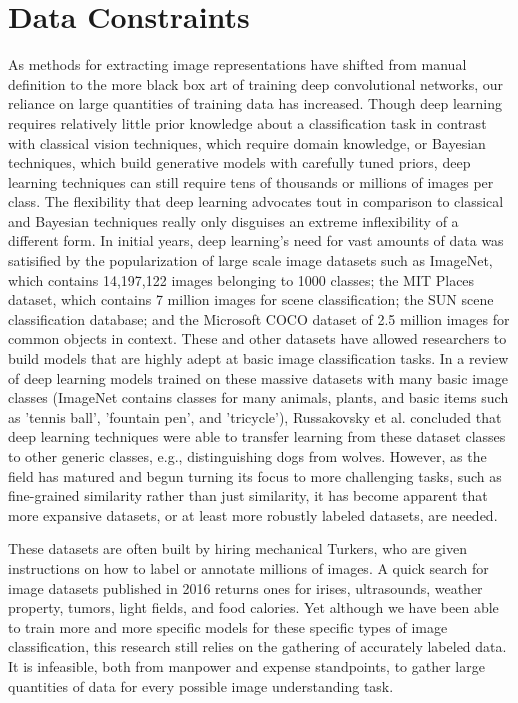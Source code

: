 \section{Data Constraints}
As methods for extracting image representations have shifted from manual definition to the more black box art of training deep convolutional networks, our reliance on large quantities of training data has increased. Though deep learning requires relatively little prior knowledge about a classification task in contrast with classical vision techniques, which require domain knowledge, or Bayesian techniques, which build generative models with carefully tuned priors, deep learning techniques can still require tens of thousands or millions of images per class. The flexibility that deep learning advocates tout in comparison to classical and Bayesian techniques really only disguises an extreme inflexibility of a different form. In initial years, deep learning's need for vast amounts of data was satisified by the popularization of large scale image datasets such as ImageNet, which contains 14,197,122 images belonging to 1000 classes\cite{deng2009imagenet}; the MIT Places dataset, which contains 7 million images for scene classification\cite{zhou2014learning}; the SUN scene classification database\cite{xiao2010sun}; and the Microsoft COCO dataset of 2.5 million images for common objects in context\cite{lin2014microsoft}. These and other datasets have allowed researchers to build models that are highly adept at basic image classification tasks\cite{russakovsky2013detecting}. In a review of deep learning models trained on these massive datasets with many basic image classes (ImageNet contains classes for many animals, plants, and basic items such as 'tennis ball', 'fountain pen', and 'tricycle'),  Russakovsky et al. concluded that deep learning techniques were able to transfer learning from these dataset classes to other generic classes, e.g., distinguishing dogs from wolves.\cite{russakovsky2013detecting} However, as the field has matured and begun turning its focus to more challenging tasks, such as fine-grained similarity rather than just similarity, it has become apparent that more expansive datasets, or at least more robustly labeled datasets, are needed.

These datasets are often built by hiring mechanical Turkers, who are given instructions on how to label or annotate millions of images. A quick search for image datasets published in 2016 returns ones for irises, ultrasounds, weather property, tumors, light fields, and food calories.\cite{bowyer2016nd}\cite{cortes2016ultrasound}\cite{chu2016image2weather}\cite{shi2016stacked}\cite{paudyal2016smart}\cite{pouladzadeh2015foodd} Yet although we have been able to train more and more specific models for these specific types of image classification, this research still relies on the gathering of accurately labeled data. It is infeasible, both from manpower and expense standpoints, to gather large quantities of data for every possible image understanding task.


